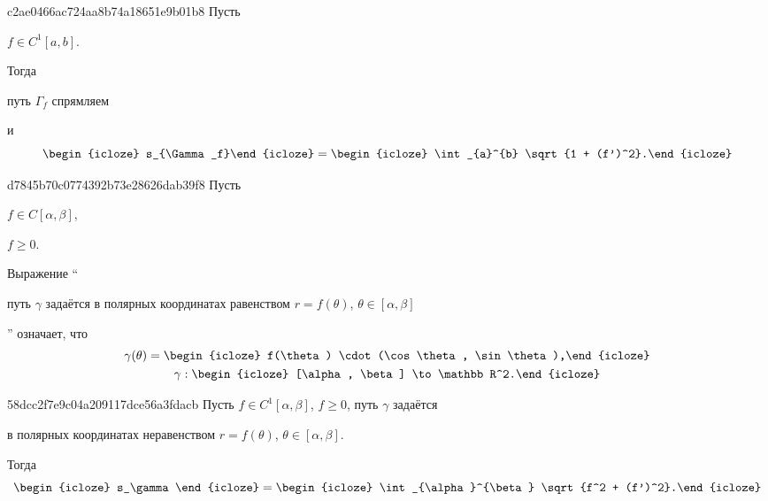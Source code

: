 \begin{note}{c2ae0466ac724aa8b74a18651e9b01b8}
    Пусть \begin{icloze}{3}\({ f \in C^{1}[a, b] }\).\end{icloze} Тогда \begin{icloze}{4}путь \({ \Gamma_f }\) спрямляем\end{icloze} и
    \[
        \begin{icloze}{2}s_{\Gamma_f}\end{icloze} = \begin{icloze}{1}\int_{a}^{b} \sqrt{1 + (f')^2}.\end{icloze}
    \]
\end{note}

\begin{note}{d7845b70c0774392b73e28626dab39f8}
    Пусть \begin{icloze}{3}\({ f \in C[\alpha, \beta] }\),\end{icloze} \begin{icloze}{4}\({ f \geqslant 0 }\).\end{icloze}
    Выражение ``\begin{icloze}{2}путь \({ \gamma }\) задаётся в полярных координатах равенством \({ r = f(\theta) }\),\: \({ \theta \in [\alpha, \beta] }\)\end{icloze}'' означает, что
    \[
        \begin{gathered}
            \gamma(\theta) = \begin{icloze}{1}f(\theta) \cdot (\cos \theta, \sin \theta),\end{icloze} \\
            \gamma : \begin{icloze}{5}[\alpha, \beta] \to \mathbb R^2.\end{icloze}
        \end{gathered}
    \]
\end{note}

\begin{note}{58dcc2f7e9c04a209117dce56a3fdacb}
    Пусть \({ f \in C^{1}[\alpha, \beta] }\), \({ f \geqslant 0 }\), путь \({ \gamma }\) задаётся \begin{icloze}{2}в полярных координатах неравенством \({ r = f(\theta) }\),\: \({ \theta \in [\alpha, \beta] }\).\end{icloze} Тогда
    \[
        \begin{icloze}{3}s_\gamma\end{icloze} = \begin{icloze}{1}\int_{\alpha}^{\beta} \sqrt{f^2 + (f')^2}.\end{icloze}
    \]
\end{note}

